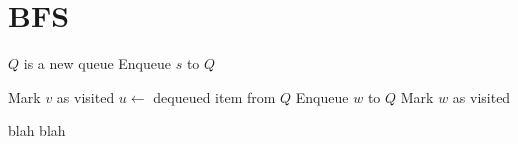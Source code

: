 \section{BFS}

\noindent \hrulefill
\begin{algorithmic}[1]
   
  \State $Q$ is a new queue
  \State Enqueue $s$ to $Q$
  \item[]
  \State Mark $v$ as visited
  \State $u \gets$ dequeued item from $Q$
  \State Enqueue $w$ to $Q$
  \State Mark $w$ as visited
  \EndIf
  \EndFor
  \EndWhile
  \EndFunction
\end{algorithmic}
\noindent \hrulefill

blah blah
